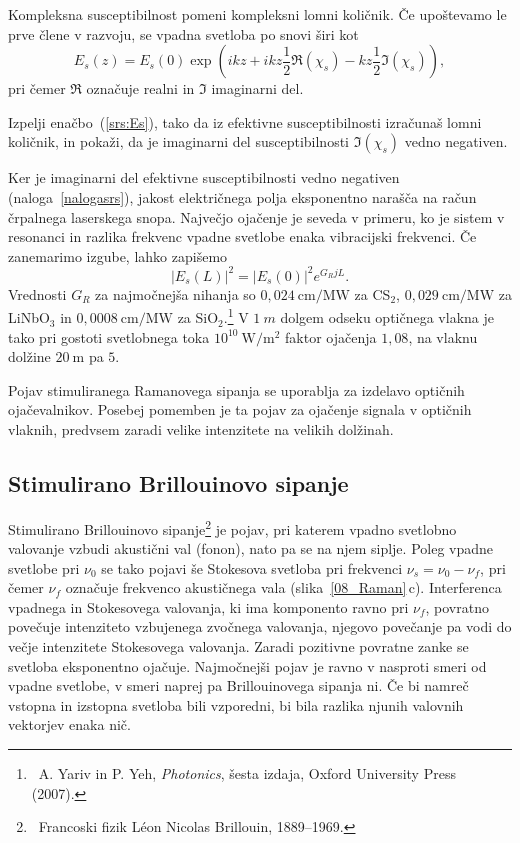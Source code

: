 Kompleksna susceptibilnost pomeni kompleksni lomni količnik. Če upoštevamo
le prve člene v razvoju, se vpadna svetloba po snovi širi kot
\begin{equation}
E_s(z) = E_s(0)\exp\left(i k z + ikz\frac{1}{2}\Re(\chi_s)- k z \frac{1}{2}\Im(\chi_s)\right)\!,
\label{srs:Es}
\end{equation}
pri čemer $\Re$ označuje realni in $\Im$ imaginarni del.
\begin{definition}
\label{nalogasrs}
 Izpelji enačbo~(\ref{srs:Es}), tako da iz efektivne susceptibilnosti izračunaš lomni količnik,
in pokaži, da je imaginarni del susceptibilnosti $\Im(\chi_s)$ vedno negativen. 
\end{definition}
Ker je imaginarni del efektivne susceptibilnosti vedno negativen (naloga~\ref{nalogasrs}), 
jakost e\-lek\-trič\-nega polja eksponentno narašča na račun črpalnega laserskega snopa. 
Največjo ojačenje je seveda v primeru, ko je sistem v resonanci
in razlika frekvenc vpadne svetlobe enaka vibracijski frekvenci.
Če zanemarimo izgube, lahko zapišemo
\begin{equation}
|E_s(L)|^2 = |E_s(0)|^2 e^{G_RjL}.
\end{equation}
Vrednosti $G_R$ za najmočnejša nihanja so $0,024~\si{\cm/\mega\watt}$ za CS$_2$, 
$0,029~\si{\cm/\mega\watt}$ za LiNbO$_3$ 
in $0,0008~\si{\cm/\mega\watt}$ za SiO$_2$.\footnote{~A. Yariv in 
P. Yeh, {\it Photonics}, šesta izdaja, Oxford University Press (2007).}
V $1~\si{m}$ dolgem odseku optičnega vlakna je tako pri gostoti svetlobnega toka 
$10^{10}~\si{\watt/\meter^2}$  faktor ojačenja $1,08$, na vlaknu dolžine $20~\si{\metre}$
pa $5$.

\begin{remark}
Pojav stimuliranega Ramanovega sipanja se uporablja za izdelavo optičnih 
ojačevalnikov. Posebej pomemben je ta pojav za ojačenje signala v 
optičnih vlaknih, predvsem zaradi velike intenzitete na velikih dolžinah.
\end{remark}

\subsection*{Stimulirano Brillouinovo sipanje}
Stimulirano Brillouinovo sipanje\footnote{~Francoski fizik L\'eon Nicolas Brillouin, 1889--1969.} je 
pojav, pri katerem vpadno svetlobno valovanje
vzbudi akustični val (fonon), nato pa se na njem siplje. Poleg vpadne svetlobe pri $\nu_0$
se tako pojavi še Stokesova svetloba pri frekvenci $\nu_s = \nu_0-\nu_f$, pri čemer 
$\nu_f$ označuje frekvenco akustičnega vala  (slika~\ref{08_Raman}\,c). Interferenca
vpadnega in Stokesovega valovanja, ki ima komponento ravno pri $\nu_f$, povratno
povečuje intenziteto vzbujenega zvočnega valovanja, njegovo povečanje pa vodi do
večje intenzitete Stokesovega valovanja. Zaradi pozitivne povratne zanke se 
svetloba eksponentno ojačuje. Najmočnejši pojav je 
ravno v nasproti smeri od vpadne svetlobe, v smeri naprej pa Brillouinovega sipanja ni.
Če bi namreč vstopna in izstopna svetloba bili vzporedni, bi bila razlika njunih
valovnih vektorjev enaka nič. 

